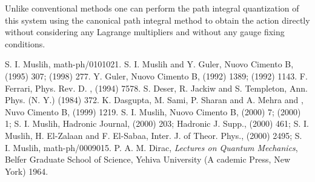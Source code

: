 \documentclass[a4paper,12pt]{article}
\begin{document}
Unlike conventional methods one can  perform the path integral
quantization of this system using the canonical path integral
method \cite{sm3}to obtain the action directly without
 considering any Lagrange multipliers and without any gauge fixing conditions.
\begin{thebibliography}{}%
 S. I. Muslih, math-ph/0101021.
S. I. Muslih and Y. Guler, Nuovo Cimento B, \coordHE{}
(1995) 307; \coordHE{} (1998) 277.
Y. Guler, Nuovo Cimento B, \coordHE{}(1992) 1389;
 \coordHE{} (1992) 1143.
 F. Ferrari, Phys. Rev. D. \coordHE{}, (1994) 7578.
 S. Deser, R. Jackiw and S. Templeton, Ann. Phys. (N.
Y.) \coordHE{} (1984) 372.
K. Dasgupta, M. Sami, P. Sharan and A. Mehra and ,
Nuvo Cimento B, \coordHE{} (1999) 1219.
S. I. Muslih, Nuovo Cimento B, \coordHE{} (2000) 7;
\coordHE{} (2000) 1; S. I. Muslih, Hadronic Journal,
\coordHE{} (2000) 203; Hadronic J. Supp.,  \coordHE{} (2000)
461; S. I. Muslih, H. El-Zalaan and F. El-Sabaa, Inter. J. of
Theor. Phys., \coordHE{} (2000) 2495; S. I. Muslih,
math-ph/0009015.
P. A. M. Dirac, {\it Lectures on Quantum Mechanics}, Belfer
 Graduate School of Science, Yehiva University (A cademic Press,
 New York) 1964.
\end{thebibliography}
\end{document}
